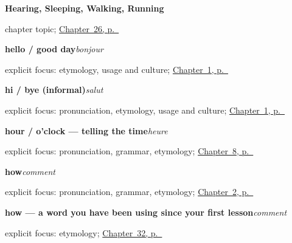 \noindent\begin{minipage}[t]{\linewidth}
\raggedright
\textbf{Hearing, Sleeping, Walking, Running}\par
\footnotesize chapter topic; \hyperref[ch:fr-hearing-sleeping-walking-running]{Chapter~26, p.~\pageref*{ch:fr-hearing-sleeping-walking-running}}
\end{minipage}\par\smallskip

\noindent\begin{minipage}[t]{\linewidth}
\raggedright
\textbf{hello / good day}\enspace\emph{bonjour}\par
\footnotesize explicit focus: etymology, usage and culture; \hyperref[ch:greetings]{Chapter~1, p.~\pageref*{ch:greetings}}
\end{minipage}\par\smallskip

\noindent\begin{minipage}[t]{\linewidth}
\raggedright
\textbf{hi / bye (informal)}\enspace\emph{salut}\par
\footnotesize explicit focus: pronunciation, etymology, usage and culture; \hyperref[ch:greetings]{Chapter~1, p.~\pageref*{ch:greetings}}
\end{minipage}\par\smallskip

\noindent\begin{minipage}[t]{\linewidth}
\raggedright
\textbf{hour / o'clock — telling the time}\enspace\emph{heure}\par
\footnotesize explicit focus: pronunciation, grammar, etymology; \hyperref[ch:time]{Chapter~8, p.~\pageref*{ch:time}}
\end{minipage}\par\smallskip

\noindent\begin{minipage}[t]{\linewidth}
\raggedright
\textbf{how}\enspace\emph{comment}\par
\footnotesize explicit focus: pronunciation, grammar, etymology; \hyperref[ch:introductions]{Chapter~2, p.~\pageref*{ch:introductions}}
\end{minipage}\par\smallskip

\noindent\begin{minipage}[t]{\linewidth}
\raggedright
\textbf{how — a word you have been using since your first lesson}\enspace\emph{comment}\par
\footnotesize explicit focus: etymology; \hyperref[ch:fr-questions]{Chapter~32, p.~\pageref*{ch:fr-questions}}
\end{minipage}\par\smallskip

